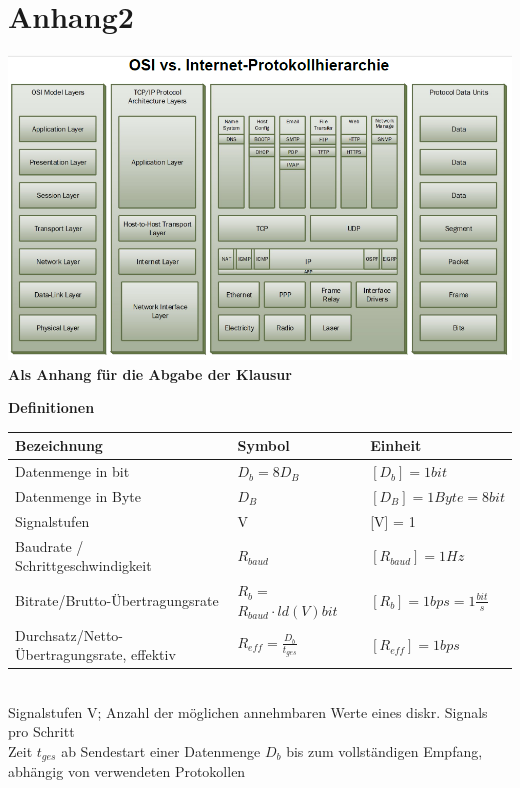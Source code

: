 \documentclass[fs, footer]{latex4ei}
\begin{document}
\section{Anhang2}
 \includegraphics[scale = 1.1]{./img/OSI_Modell3.png} \\
 
 \newpage
 \textbf{Als Anhang für die Abgabe der Klausur}




	\textbf{Definitionen}	
	
	
	\begin{tabular*}{\columnwidth}{p{1.8cm} | p{1.6cm} | p{2.5cm}}
		Bezeichnung & Symbol & Einheit \\ \hline
		Datenmenge in bit & $D_b = 8 D_B $ & $[D_b] = 1 bit$   \\ \hline
		Datenmenge in Byte & $D_B$ & $[D_B] = 1 Byte = 8 bit  $  \\ \hline
		Signalstufen & V & [V] = 1   \\ \hline
		Baudrate / Schrittgeschwindigkeit & $R_{baud}$ & $[R_{baud}] = 1 Hz $   \\ \hline
		Bitrate/Brutto-Übertragungsrate & $R_b = $$ R_{baud} \cdot ld(V) bit $ & $[R_b] = 1 bps = 1 \frac{bit}{s} $  \\ \hline
		Durchsatz/Netto-Übertragungsrate, effektiv & $R_{eff} = \frac{D_b}{t_{ges}}$ & $[R_{eff}] = 1 bps $ \\
		
		
	\end{tabular*}\\
	
	Signalstufen V; Anzahl der möglichen annehmbaren Werte eines diskr. Signals pro Schritt \\
	Zeit $t_{ges}$ ab Sendestart einer Datenmenge $D_b$ bis zum vollständigen Empfang, abhängig von verwendeten Protokollen \\
	
	


\end{document}
